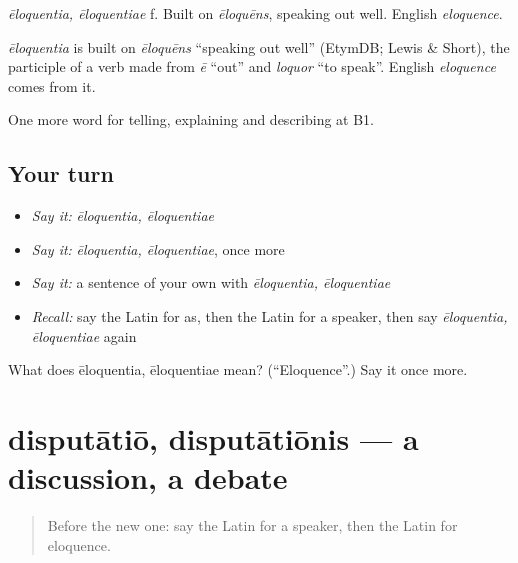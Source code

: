 \emph{ēloquentia, ēloquentiae} f. Built on \emph{ēloquēns}, speaking out well. English \emph{eloquence}.

\begin{cousinweb}
\emph{ēloquentia} is built on \emph{ēloquēns} \textquotedblleft{}speaking out well\textquotedblright{} (EtymDB; Lewis \& Short), the participle of a verb made from \emph{ē} \textquotedblleft{}out\textquotedblright{} and \emph{loquor} \textquotedblleft{}to speak\textquotedblright{}. English \emph{eloquence} comes from it.
\end{cousinweb}

\begin{grammarlens}[title={What you've built}]
One more word for telling, explaining and describing at B1.
\end{grammarlens}

\subsection*{Your turn}
\begin{itemize}
\raggedright
  \item \emph{Say it:} \emph{ēloquentia, ēloquentiae}
  \item \emph{Say it:} \emph{ēloquentia, ēloquentiae}, once more
  \item \emph{Say it:} a sentence of your own with \emph{ēloquentia, ēloquentiae}
  \item \emph{Recall:} say the Latin for as, then the Latin for a speaker, then say \emph{ēloquentia, ēloquentiae} again
\end{itemize}

\begin{tcolorbox}[breakable,colback=teal!4,colframe=teal!35!black,title={Before you move on}]
What does ēloquentia, ēloquentiae mean? (\textquotedblleft{}Eloquence\textquotedblright{}.) Say it once more.
\end{tcolorbox}
\section[disputātiō, disputātiōnis]{disputātiō, disputātiōnis — a discussion, a debate}

\label{lesson:LA-C368-disputatio}



\begin{quote}
Before the new one: say the Latin for a speaker, then the Latin for eloquence.
\end{quote}

